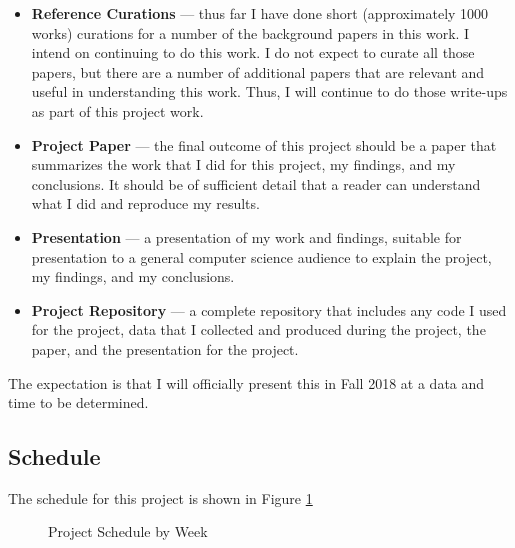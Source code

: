 \documentclass[letterpaper,twocolumn,10pt]{article}
\def\GanttHeader#1#2#3#4{%
 \pgfmathparse{(#1-#2-#3)/#4}
 \tikzset{y=7mm, task number/.style={left, font=\bfseries},
     task description/.style={text width=#3,  right, draw=none,
           font=\sffamily, xshift=#2,
           minimum height=2em},
     gantt bar/.style={draw=black, fill=blue!30},
     help lines/.style={draw=black!30, dashed},
     x=\pgfmathresult pt
     }
  \def\totalmonths{#4}
  \node (Header) [task description] at (0,0) {\textbf{\large Task Description}};
  \begin{scope}[shift=($(Header.south east)$)]
    \foreach \x in {1,...,#4}
      \node[above] at (\x,0) {\footnotesize\x};
 \end{scope}
}
\def\Task#1#2#3#4{%
\node[task number] at ($(Header.west) + (0, -#1)$) {#1};
\node[task description] at (0,-#1) {#2};
\begin{scope}[shift=($(Header.south east)$)]
  \draw (0,-#1) rectangle +(\totalmonths, 1);
  \foreach \x in {1,...,\totalmonths}
    \draw[help lines] (\x,-#1) -- +(0,1);
  \filldraw[gantt bar] ($(#3, -#1+0.2)$) rectangle +(#4,0.6);
\end{scope}
}
\begin{document}
\begin{itemize}

    \item \textbf{Reference Curations} --- thus far I have done short (approximately 1000 works) curations for a number of the background papers
    in this work.  I intend on continuing to do this work.  I do not expect to curate all those papers, but there are a number of additional papers that are relevant and useful in understanding this work.  Thus, I will continue to do those write-ups as part of this project work.

    \item \textbf{Project Paper} --- the final outcome of this project should be a paper that summarizes the work that I did for this project, my
    findings, and my conclusions. It should be of sufficient detail that a reader can understand what I did and reproduce my results.

    \item \textbf{Presentation} --- a presentation of my work and findings, suitable for presentation to a general computer science audience
    to explain the project, my findings, and my conclusions.

    \item \textbf{Project Repository} --- a complete repository that includes any code I used for the project, data that I collected and
    produced during the project, the paper, and the presentation for the project.
\end{itemize}

The expectation is that I will officially present this in Fall 2018 at a data and time to be determined.

\subsection{Schedule}

The schedule for this project is shown in Figure \ref{schedule}

\begin{figure}
    \centering
    \caption{Project Schedule by Week}\label{schedule}
\end{figure}
\end{document}
